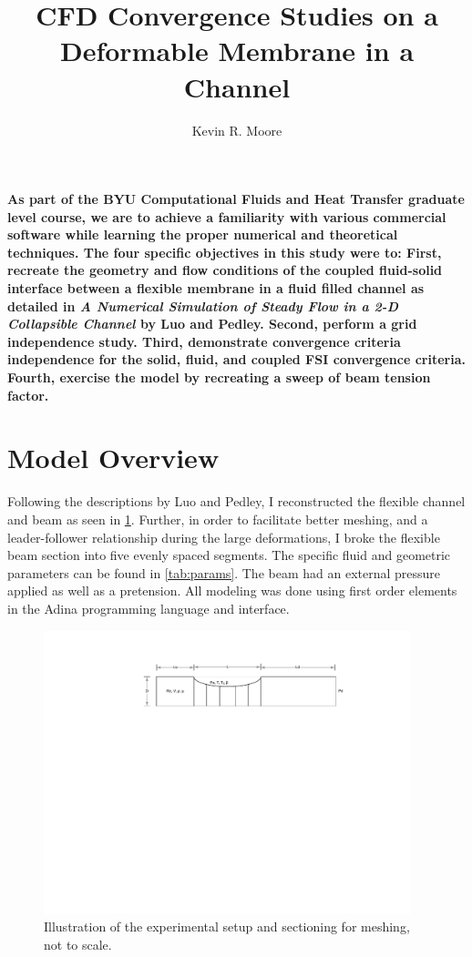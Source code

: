 \documentclass[10pt,english]{article}
\title{\vspace{-20pt}CFD Convergence Studies on a Deformable Membrane in a Channel}
\author{Kevin R. Moore}
\affil{\vspace{-10pt}Brigham Young University}
\date{}
\begin{document}
\maketitle
\vspace{0pt}
   \textbf{As part of the BYU Computational Fluids and Heat Transfer graduate level course, we are to achieve a familiarity with various commercial software while learning the proper numerical and theoretical techniques.  The four specific objectives in this study were to: First, recreate the geometry and flow conditions of the coupled fluid-solid interface between a flexible membrane in a fluid filled channel as detailed in \textit{A Numerical Simulation of Steady Flow in a 2-D Collapsible Channel} by Luo and Pedley. Second, perform a grid independence study.  Third, demonstrate convergence criteria independence for the solid, fluid, and coupled FSI convergence criteria.  Fourth, exercise the model by recreating a sweep of beam tension factor.  }

\vspace{0pt}

\section{Model Overview}

Following the descriptions by Luo and Pedley, I reconstructed the flexible channel and beam as seen in \cref{f:setup}.  Further, in order to facilitate better meshing, and a leader-follower relationship during the large deformations, I broke the flexible beam section into five evenly spaced segments.  The specific fluid and geometric parameters can be found in \cref{tab:params}.  The beam had an external pressure applied as well as a pretension.    All modeling was done using first order elements in the Adina programming language and interface.

\begin{figure}[htbp]
\centering
\includegraphics[trim={7.5cm 15.5cm 5.6cm 2.5cm},clip,width=0.95\textwidth]{Adina_Setup}
\caption{Illustration of the experimental setup and sectioning for meshing, not to scale.}
\label{f:setup}
\end{figure}
\end{document}
